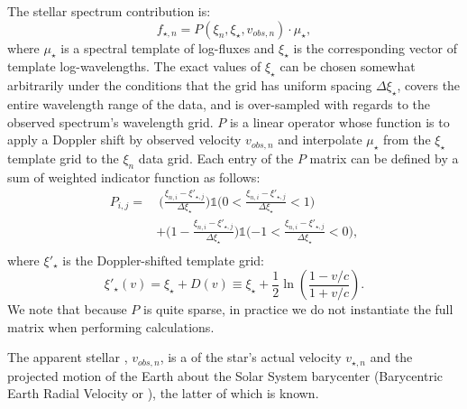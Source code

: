 \documentclass[twocolumn]{aastex62}
\begin{document}
The stellar spectrum contribution is: 
\begin{equation}
f_{\star,n} = P(\xi_n, \xi_{\star}, v_{obs,n}) \cdot \mu_{\star},
\label{eqn:star}
\end{equation}
where $\mu_{\star}$ is a spectral template of log-fluxes and 
$\xi_{\star}$ is the corresponding vector of template log-wavelengths. 
The exact values of $\xi_{\star}$ can be chosen somewhat arbitrarily under the conditions that the grid has uniform spacing $\Delta\xi_{\star}$, covers the entire wavelength range of the data, and is over-sampled with regards to the observed spectrum's wavelength grid.
$P$ is a linear operator whose function is to apply a Doppler shift by observed velocity $v_{obs,n}$ and
interpolate $\mu_{\star}$ from the $\xi_{\star}$ template grid to the $\xi_n$ data grid.
Each entry of the $P$ matrix can be defined by a sum of weighted indicator function as follows:
\begin{equation}
\begin{split}
 P_{i,j} =  &\ \Big(\frac{\xi_{n,i} - \xi'_{\star,j}}{\Delta\xi_{\star}}\Big) \mathbb{1}\big(0 < \frac{\xi_{n,i} - \xi'_{\star,j}}{\Delta\xi_{\star}} < 1\big) \\
  &+ \Big(1 - \frac{\xi_{n,i} - \xi'_{\star,j}}{\Delta\xi_{\star}}\Big) \mathbb{1}\big({-1} < \frac{\xi_{n,i} - \xi'_{\star,j}}{\Delta\xi_{\star}} < 0\big), \\
 \end{split}
\end{equation}
where $\xi'_{\star}$ is the Doppler-shifted template grid:
\begin{equation}
 \xi'_{\star}(v) = \xi_{\star} + D(v) \equiv \xi_{\star} + \frac{1}{2} \ln \left(\frac{1 - v/c}{1 + v/c}\right).
\end{equation}
We note that because $P$ is quite sparse, in practice we do not instantiate the full matrix when performing calculations. 

The apparent stellar \RV, $v_{obs,n}$, is a  of the star's actual velocity  $v_{\star,n}$ and the projected motion of the Earth about the Solar System barycenter (Barycentric Earth Radial Velocity or \BERV), the latter of which is known. 
\end{document}
